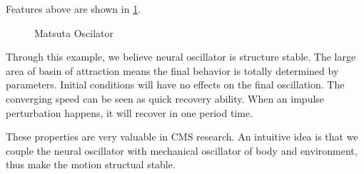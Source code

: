 Features above are shown in \figurename \ref{fig:matsuta oscilation}.
\begin{figure}[!h]
\centerline{
\hfill
{}
}
\caption{Matsuta Oscilator}
\label{fig:matsuta oscilation}
\end{figure} 

Through this example, we believe neural oscillator is structure stable.
The large area of basin of attraction means the final behavior is totally determined by parameters. 
Initial conditions will have no effects on the final oscillation. 
The converging speed can be seen as quick recovery ability.
When an impulse perturbation happens, it will recover in one period time.

These properties are very valuable in CMS research. 
An intuitive idea is that we couple the neural oscillator with mechanical oscillator of body and environment, thus make the motion structual stable.
